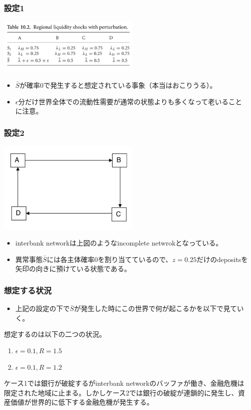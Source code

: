 \documentclass[dvipdfmx, 12pt]{beamer}
\begin{document}
\begin{frame}\frametitle{設定1}
	\includegraphics[width = 7cm]{10-2.png}
	
	\begin{itemize}
	\item $\bar{S}$が確率0で発生すると想定されている事象（本当はおこりうる）。
	\item $\epsilon$分だけ世界全体での流動性需要が通常の状態よりも多くなって老いることに注意。
	\end{itemize}
\end{frame}

\begin{frame}\frametitle{設定2}
	\includegraphics[width = 7cm]{10-5.png}
	\begin{itemize}
	\item interbank networkは上図のようなincomplete netwrokとなっている。
	\item 異常事態$\bar{S}$には各主体確率0を割り当てているので、$z = 0.25$だけのdepositsを矢印の向きに預けている状態である。
	\end{itemize}
\end{frame}

\begin{frame}\frametitle{想定する状況}
	\begin{itemize}
	\item 上記の設定の下で$\bar{S}$が発生した時にこの世界で何が起こるかを以下で見ていく。
	\end{itemize}
	想定するのは以下の二つの状況。
	\begin{enumerate}
	\item $\epsilon = 0.1, R = 1.5$
	\item $\epsilon = 0.1, R = 1.2$
	\end{enumerate}
	ケース1では銀行が破綻するがinterbank networkのバッファが働き、金融危機は限定された地域に止まる。しかしケース2では銀行の破綻が連鎖的に発生し、資産価値が世界的に低下する金融危機が発生する。
\end{frame}
\end{document}
